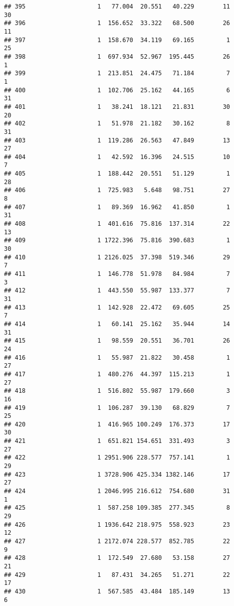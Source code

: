 \documentclass[
]{article}
\begin{document}
\begin{verbatim}
## 395                    1   77.004  20.551   40.229        11        30
## 396                    1  156.652  33.322   68.500        26        11
## 397                    1  158.670  34.119   69.165         1        25
## 398                    1  697.934  52.967  195.445        26         1
## 399                    1  213.851  24.475   71.184         7         1
## 400                    1  102.706  25.162   44.165         6        31
## 401                    1   38.241  18.121   21.831        30        20
## 402                    1   51.978  21.182   30.162         8        31
## 403                    1  119.286  26.563   47.849        13        27
## 404                    1   42.592  16.396   24.515        10         7
## 405                    1  188.442  20.551   51.129         1        28
## 406                    1  725.983   5.648   98.751        27         8
## 407                    1   89.369  16.962   41.850         1        31
## 408                    1  401.616  75.816  137.314        22        13
## 409                    1 1722.396  75.816  390.683         1        30
## 410                    1 2126.025  37.398  519.346        29         7
## 411                    1  146.778  51.978   84.984         7         3
## 412                    1  443.550  55.987  133.377         7        31
## 413                    1  142.928  22.472   69.605        25         7
## 414                    1   60.141  25.162   35.944        14        31
## 415                    1   98.559  20.551   36.701        26        24
## 416                    1   55.987  21.822   30.458         1        27
## 417                    1  480.276  44.397  115.213         1        27
## 418                    1  516.802  55.987  179.660         3        16
## 419                    1  106.287  39.130   68.829         7        25
## 420                    1  416.965 100.249  176.373        17        30
## 421                    1  651.821 154.651  331.493         3        27
## 422                    1 2951.906 228.577  757.141         1        29
## 423                    1 3728.906 425.334 1382.146        17        27
## 424                    1 2046.995 216.612  754.680        31         1
## 425                    1  587.258 109.385  277.345         8        29
## 426                    1 1936.642 218.975  558.923        23        12
## 427                    1 2172.074 228.577  852.785        22         9
## 428                    1  172.549  27.680   53.158        27        21
## 429                    1   87.431  34.265   51.271        22        17
## 430                    1  567.585  43.484  185.149        13         6

\end{verbatim}
\end{document}
